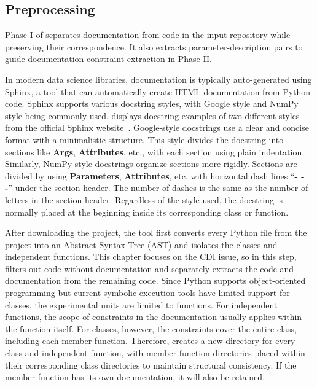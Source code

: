 \subsection{Preprocessing}\label{sec:preprocess-mpchecker}
Phase I of  separates documentation from code in the input repository while preserving their correspondence. It also extracts parameter-description pairs to guide documentation constraint extraction in Phase II.

In modern data science libraries, documentation is typically auto-generated using Sphinx, a tool that can automatically create HTML documentation from Python code. Sphinx supports various docstring styles, with Google style and NumPy style being commonly used.  displays docstring examples of two different styles from the official Sphinx website~\cite{sphnix:google,sphnix:numpy}. Google-style docstrings use a clear and concise format with a minimalistic structure. This style divides the docstring into sections like \textbf{Args}, \textbf{Attributes}, etc., with each section using plain indentation. Similarly, NumPy-style docstrings organize sections more rigidly. Sections are divided by using \textbf{Parameters}, \textbf{Attributes}, etc. with horizontal dash lines ``\textbf{- - -}'' under the section header. The number of dashes is the same as the number of letters in the section header. Regardless of the style used, the docstring is normally placed at the beginning inside its corresponding class or function.

After downloading the project, the tool first converts every Python file from the project into an Abstract Syntax Tree (AST) and isolates the classes and independent functions. This chapter focuses on the CDI issue, so in this step, \toolchecker filters out code without documentation and separately extracts the code and documentation from the remaining code. Since Python supports object-oriented programming but current symbolic execution tools have limited support for classes, the experimental units are limited to functions. For independent functions, the scope of constraints in the documentation usually applies within the function itself. For classes, however, the constraints cover the entire class, including each member function. Therefore, \toolchecker creates a new directory for every class and independent function, with member function directories placed within their corresponding class directories to maintain structural consistency. If the member function has its own documentation, it will also be retained.

